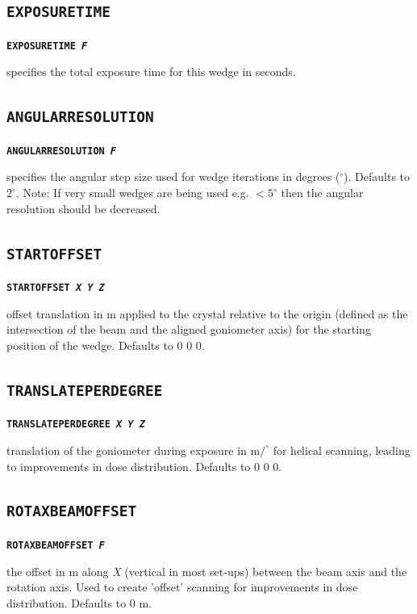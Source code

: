 \documentclass[a4paper]{article}
\newcommand{\Keyword}[1]{\texttt{\textbf{#1}}\xspace}
\begin{document}
\subsection{\Keyword{EXPOSURETIME}}
\label{exposuretime}
\noindent \Keyword{EXPOSURETIME \textit{F}}

specifies the total exposure time for this wedge in seconds.



\subsection{\Keyword{ANGULARRESOLUTION}}

\noindent \Keyword{ANGULARRESOLUTION \textit{F}}

specifies the angular step size used for wedge iterations in degrees ($^\circ$). Defaults to $2^\circ$.
\newline
Note: If very small wedges are being used e.g. $<5^{\circ}$ then the angular resolution should be decreased.



\subsection{\Keyword{STARTOFFSET}}

\noindent \Keyword{STARTOFFSET \textit{X Y Z}}

offset translation in \hbox{\textmu}m applied to the crystal relative to the origin (defined as the intersection of the beam and the aligned goniometer axis) for the starting position of the wedge. Defaults to 0 0 0.



\subsection{\Keyword{TRANSLATEPERDEGREE}}

\noindent \Keyword{TRANSLATEPERDEGREE \textit{X Y Z}}

translation of the goniometer during exposure in \hbox{\textmu}m$/^{\circ}$ for helical scanning, leading to improvements in dose distribution. Defaults to 0 0 0.



\subsection{\Keyword{ROTAXBEAMOFFSET}}

\noindent \Keyword{ROTAXBEAMOFFSET \textit{F}}

the offset in \hbox{\textmu}m along \textit{X} (vertical in most set-ups) between the beam axis and the rotation axis. Used to create 'offset' scanning for improvements in dose distribution. Defaults to 0 \hbox{\textmu}m.
\end{document}
